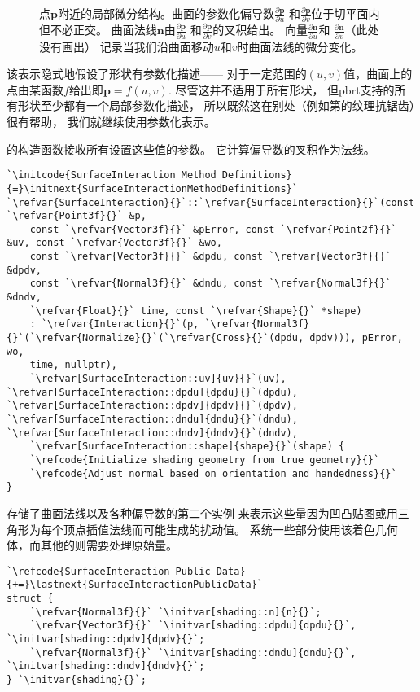 \begin{figure}[htbp]
    \centering
    \caption{点$\bm p$附近的局部微分结构。曲面的参数化偏导数$\displaystyle\frac{\partial \bm p}{\partial u}$
        和$\displaystyle\frac{\partial \bm p}{\partial v}$位于切平面内但不必正交。
        曲面法线$\bm n$由$\displaystyle\frac{\partial \bm p}{\partial u}$
        和$\displaystyle\frac{\partial \bm p}{\partial v}$的叉积给出。
        向量$\displaystyle\frac{\partial \bm n}{\partial u}$和
        $\displaystyle\frac{\partial \bm n}{\partial v}$（此处没有画出）
        记录当我们沿曲面移动$u$和$v$时曲面法线的微分变化。}
    \label{fig:2.19}
\end{figure}

该表示隐式地假设了形状有参数化描述——
对于一定范围的$(u,v)$值，曲面上的点由某函数$f$给出即$\bm p=f(u,v)$.
尽管这并不适用于所有形状，
但pbrt支持的所有形状至少都有一个局部参数化描述，
所以既然这在别处（例如第的纹理抗锯齿）很有帮助，
我们就继续使用参数化表示。

的构造函数接收所有设置这些值的参数。
它计算偏导数的叉积作为法线。
\begin{lstlisting}
`\initcode{SurfaceInteraction Method Definitions}{=}\initnext{SurfaceInteractionMethodDefinitions}`
`\refvar{SurfaceInteraction}{}`::`\refvar{SurfaceInteraction}{}`(const `\refvar{Point3f}{}` &p,
    const `\refvar{Vector3f}{}` &pError, const `\refvar{Point2f}{}` &uv, const `\refvar{Vector3f}{}` &wo,
    const `\refvar{Vector3f}{}` &dpdu, const `\refvar{Vector3f}{}` &dpdv,
    const `\refvar{Normal3f}{}` &dndu, const `\refvar{Normal3f}{}` &dndv,
    `\refvar{Float}{}` time, const `\refvar{Shape}{}` *shape)
    : `\refvar{Interaction}{}`(p, `\refvar{Normal3f}{}`(`\refvar{Normalize}{}`(`\refvar{Cross}{}`(dpdu, dpdv))), pError, wo,
    time, nullptr),
    `\refvar[SurfaceInteraction::uv]{uv}{}`(uv), `\refvar[SurfaceInteraction::dpdu]{dpdu}{}`(dpdu), `\refvar[SurfaceInteraction::dpdv]{dpdv}{}`(dpdv), `\refvar[SurfaceInteraction::dndu]{dndu}{}`(dndu), `\refvar[SurfaceInteraction::dndv]{dndv}{}`(dndv),
    `\refvar[SurfaceInteraction::shape]{shape}{}`(shape) {
    `\refcode{Initialize shading geometry from true geometry}{}`
    `\refcode{Adjust normal based on orientation and handedness}{}`
}
\end{lstlisting}

存储了曲面法线以及各种偏导数的第二个实例
来表示这些量因为凹凸贴图或用三角形为每个顶点插值法线而可能生成的扰动值。
系统一些部分使用该着色几何体，而其他的则需要处理原始量。
\begin{lstlisting}
`\refcode{SurfaceInteraction Public Data}{+=}\lastnext{SurfaceInteractionPublicData}`
struct {
    `\refvar{Normal3f}{}` `\initvar[shading::n]{n}{}`;
    `\refvar{Vector3f}{}` `\initvar[shading::dpdu]{dpdu}{}`, `\initvar[shading::dpdv]{dpdv}{}`;
    `\refvar{Normal3f}{}` `\initvar[shading::dndu]{dndu}{}`, `\initvar[shading::dndv]{dndv}{}`;
} `\initvar{shading}{}`;
\end{lstlisting}

